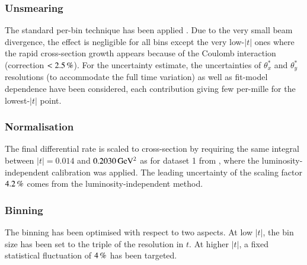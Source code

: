 
\subsubsection{Unsmearing}

The standard per-bin technique has been applied \cite{8tev-90m}. Due to the very small beam divergence, the effect is negligible for all bins except the very low-$|t|$ ones where the rapid cross-section growth appears because of the Coulomb interaction (correction $< 2.5\,{\rm \%}$). For the uncertainty estimate, the uncertainties of $\theta_x^*$ and $\theta_y^*$ resolutions (to accommodate the full time variation) as well as fit-model dependence have been considered, each contribution giving few per-mille for the lowest-$|t|$ point.

\subsubsection{Normalisation}

The final differential rate is scaled to cross-section by requiring the same integral between $|t| = 0.014$ and $0.2030\,{\rm GeV^2}$ as for dataset 1 from \cite{prl111}, where the luminosity-independent calibration was applied. The leading uncertainty of the scaling factor $4.2\,{\rm \%}$ comes from the luminosity-independent method.



\subsubsection{Binning}

The binning has been optimised with respect to two aspects. At low $|t|$, the bin size has been set to the triple of the resolution in $t$. At higher $|t|$, a fixed statistical fluctuation of $4\,{\rm \%}$ has been targeted.

